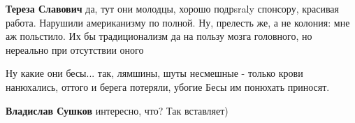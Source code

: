 \begin{itemize}
\begin{itemize}
\textbf{Тереза Славович} да, тут они молодцы, хорошо подрsraly спонсору, красивая работа. Нарушили американизму по полной. Ну, прелесть же, а не колония: мне аж польстило. Их бы традиционализм да на пользу мозга головного, но нереально при отсутствии оного
\end{itemize} %

Ну какие они бесы... так, лямшины, шуты несмешные - только крови нанюхались, оттого и берега потеряли, убогие
Бесы им понюхать приносят.

\begin{itemize} %
\textbf{Владислав Сушков} интересно, что? Так вставляет)
\end{itemize} %

\end{itemize} %
